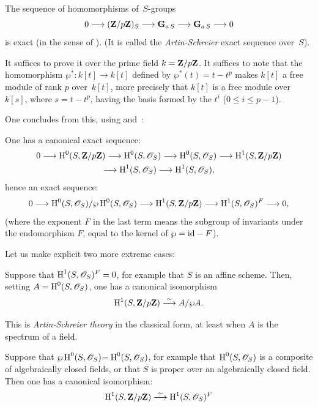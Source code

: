 \begin{proposition}
\label{XI.6.7} The sequence of homomorphisms of~$S$-groups
$$
0\to(\ZZ/p\ZZ)_S\to\GG_{a\,S}\to \GG_{a\,S}\to 0
$$
is exact (in the sense of \No {}). (It is called the
\emph{Artin-Schreier} exact sequence over~$S$).
\end{proposition}

It suffices to prove it over the prime field $k=\mathbf{Z}/p\mathbf{Z}$. It suffices
to note that the homomorphism $\wp^*\colon k[t]\to k[t]$ defined
by $\wp^*(t)=t-t^p$ makes $k[t]$ a free module of rank $p$ over~$k[t]$,
more precisely that $k[t]$ is a free module over~$k[s]$,
where $s=t-t^p$, having the basis formed by the $t^i$ ($0\leq i\leq p-1$).

One concludes from this, using  and~:

\begin{proposition}
\label{XI.6.8} One has a canonical exact sequence:
\begin{multline*}
0\to\H^0(S,\ZZ/p\ZZ)\to\H^0(S,\cal{O}_S)\to\H^0(S,\cal{O}_S)\to
\H^1(S,\ZZ/p\ZZ)\\
\to\H^1(S,\cal{O}_S)\to\H^1(S,\cal{O}_S),
\end{multline*}
hence an exact sequence:
$$
0\to\H^0(S,\cal{O}_S)/\wp\H^0(S,\cal{O}_S)\to
\H^1(S,\ZZ/p\ZZ)\to\H^1(S,\cal{O}_S)^F\to 0,
$$
(where the exponent $F$ in the last term means the subgroup
of invariants under the endomorphism $F$, equal to the kernel of
$\wp=\mathrm{id}-F$).
\end{proposition}

Let us make explicit two more extreme cases:

\begin{corollary}
\label{XI.6.9} Suppose that $\H^1(S,\cal{O}_S)^F=0$, for example
that $S$ is an affine scheme. Then, setting
$A=\H^0(S,\cal{O}_S)$, one has a canonical isomorphism
$$
\operatorname{H}^1(S,\mathbf{Z}/p\mathbf{Z})\overset{\sim}{\longrightarrow} A/\wp A.
$$
\end{corollary}

This is \emph{Artin-Schreier theory} in the classical form,
at least when $A$ is the spectrum of a field.

\begin{corollary}
\label{XI.6.10}
Suppose
that $\wp\H^0(S,\cal{O}_S)\mkern1mu{=}\mkern1mu\H^0(S,\cal{O}_S)$, for example
that $\H^0(S,\cal{O}_S)$ is a composite of algebraically closed
fields, or that $S$ is proper over an algebraically closed
field. Then one has a canonical isomorphism:
$$
\H^1(S,\ZZ/p\ZZ)\isomto\H^1(S,\cal{O}_S)^F
$$
\end{corollary}

